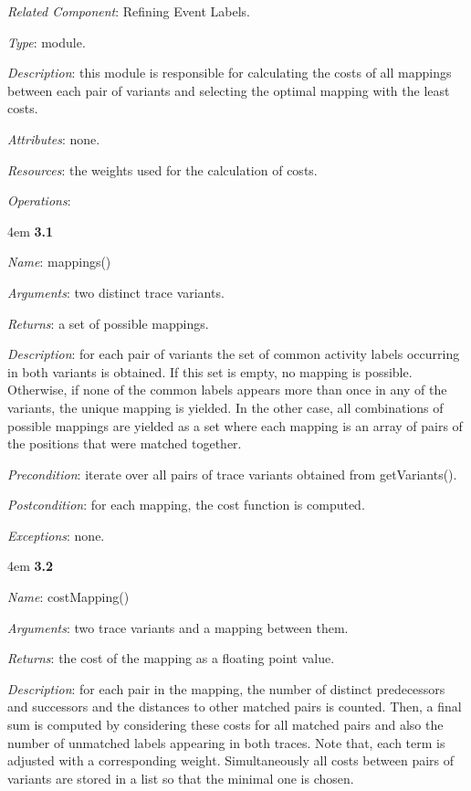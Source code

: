 \documentclass[notitlepage]{article}
\begin{document}
\begin{flushleft}
\textit{Related Component}: Refining Event Labels.

\textit{Type}: module.

\textit{Description}: this module is responsible for calculating the costs of all mappings between each pair of variants and selecting the optimal mapping with the least costs. 

\textit{Attributes}: none.

\textit{Resources}: the weights used for the calculation of costs.

\textit{Operations}: 
\medskip

\par
\begingroup
\leftskip4em
\textbf{3.1} 

\textit{Name}: mappings()

\textit{Arguments}: two distinct trace variants.

\textit{Returns}: a set of possible mappings.

\textit{Description}: for each pair of variants the set of common activity labels occurring in both variants is obtained. If this set is empty, no mapping is possible. Otherwise, if none of the common labels appears more than once in any of the variants, the unique mapping is yielded. In the other case, all combinations of possible mappings are yielded as a set where each mapping is an array of pairs of the positions that were matched together.

\textit{Precondition}: iterate over all pairs of trace variants obtained from getVariants().

\textit{Postcondition}: for each mapping, the cost function is computed.

\textit{Exceptions}: none.
\par
\endgroup


\medskip

\par
\begingroup
\leftskip4em
\textbf{3.2} 

\textit{Name}: costMapping()

\textit{Arguments}: two trace variants and a mapping between them.

\textit{Returns}: the cost of the mapping as a floating point value.

\textit{Description}: for each pair in the mapping, the number of distinct predecessors and successors and the distances to other matched pairs is counted. Then, a final sum is computed by considering these costs for all matched pairs and also the number of unmatched labels appearing in both traces. Note that, each term is adjusted with a corresponding weight. Simultaneously all costs between pairs of variants are stored in a list so that the minimal one is chosen.


\end{flushleft}
\end{document}
